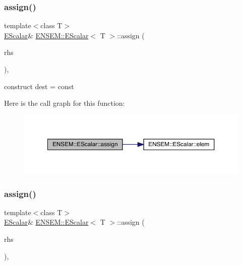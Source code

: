 \subsubsection{\texorpdfstring{assign()}{assign()}\hspace{0.1cm}{\footnotesize\ttfamily [2/6]}}
{\footnotesize\ttfamily template$<$class T$>$ \\
\mbox{\hyperlink{classENSEM_1_1EScalar}{E\+Scalar}}\& \mbox{\hyperlink{classENSEM_1_1EScalar}{E\+N\+S\+E\+M\+::\+E\+Scalar}}$<$ T $>$\+::assign (\begin{DoxyParamCaption}\item[{const typename \mbox{\hyperlink{structENSEM_1_1WordType}{Word\+Type}}$<$ T $>$\+::Type\+\_\+t \&}]{rhs }\end{DoxyParamCaption})\hspace{0.3cm}{\ttfamily [inline]}, {\ttfamily [protected]}}



construct dest = const 

Here is the call graph for this function\+:
\nopagebreak
\begin{figure}[H]
\begin{center}
\leavevmode
\includegraphics[width=350pt]{d0/d82/classENSEM_1_1EScalar_a9b88ad4d69d05f69b6483701487ddb74_cgraph}
\end{center}
\end{figure}
\mbox{\label{classENSEM_1_1EScalar_a6900444b0a609115a30ef8fc95a43da5}} 
\subsubsection{\texorpdfstring{assign()}{assign()}\hspace{0.1cm}{\footnotesize\ttfamily [3/6]}}
{\footnotesize\ttfamily template$<$class T$>$ \\
\mbox{\hyperlink{classENSEM_1_1EScalar}{E\+Scalar}}\& \mbox{\hyperlink{classENSEM_1_1EScalar}{E\+N\+S\+E\+M\+::\+E\+Scalar}}$<$ T $>$\+::assign (\begin{DoxyParamCaption}\item[{const \mbox{\hyperlink{structENSEM_1_1Zero}{Zero}} \&}]{rhs }\end{DoxyParamCaption})\hspace{0.3cm}{\ttfamily [inline]}, {\ttfamily [protected]}}



